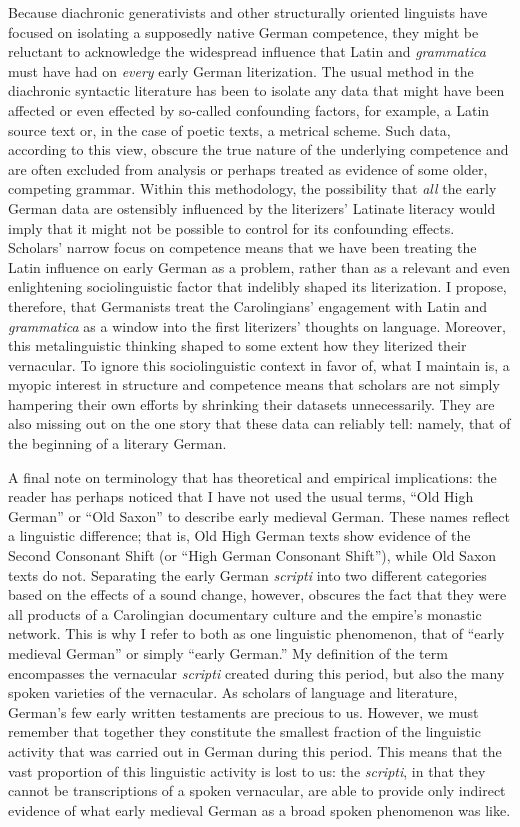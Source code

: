 Because diachronic generativists and other structurally oriented linguists have focused on isolating a supposedly native German competence, they might be reluctant to acknowledge the widespread influence that Latin and \textit{grammatica} must have had on \textit{every} early German literization. The usual method in the diachronic syntactic literature has been to isolate any data that might have been affected or even effected by so-called confounding factors, for example, a Latin source text or, in the case of poetic texts, a metrical scheme. Such data, according to this view, obscure the true nature of the underlying competence and are often excluded from analysis or perhaps treated as evidence of some older, competing grammar. Within this methodology, the possibility that \textit{all} the early German data are ostensibly influenced by the literizers’ Latinate literacy would imply that it might not be possible to control for its confounding effects. Scholars’ narrow focus on competence means that we have been treating the Latin influence on early German as a problem, rather than as a relevant and even enlightening sociolinguistic factor that indelibly shaped its literization. I propose, therefore, that Germanists treat the Carolingians’ engagement with Latin and \textit{grammatica} as a window into the first literizers’ thoughts on language. Moreover, this metalinguistic thinking shaped to some extent how they literized their vernacular. To ignore this sociolinguistic context in favor of, what I maintain is, a myopic interest in structure and competence means that scholars are not simply hampering their own efforts by shrinking their datasets unnecessarily. They are also missing out on the one story that these data can reliably tell: namely, that of the beginning of a literary German. 

A final note on terminology that has theoretical and empirical implications: the reader has perhaps noticed that I have not used the usual terms, “Old High German” or “Old Saxon” to describe early medieval German.  These names reflect a linguistic difference; that is, Old High German texts show evidence of the Second Consonant Shift (or “High German Consonant Shift”), while Old Saxon texts do not. Separating the early German \textit{scripti} into two different categories based on the effects of a sound change, however, obscures the fact that they were all products of a Carolingian documentary culture and the empire’s monastic network. This is why I refer to both as one linguistic phenomenon, that of “early medieval German” or simply “early German.” My definition of the term encompasses the vernacular \textit{scripti} created during this period, but also the many spoken varieties of the vernacular. As scholars of language and literature, German’s few early written testaments are precious to us. However, we must remember that together they constitute the smallest fraction of the linguistic activity that was carried out in German during this period. This means that the vast proportion of this linguistic activity is lost to us: the \textit{scripti}, in that they cannot be transcriptions of a spoken vernacular, are able to provide only indirect evidence of what early medieval German as a broad spoken phenomenon was like.\largerpage

